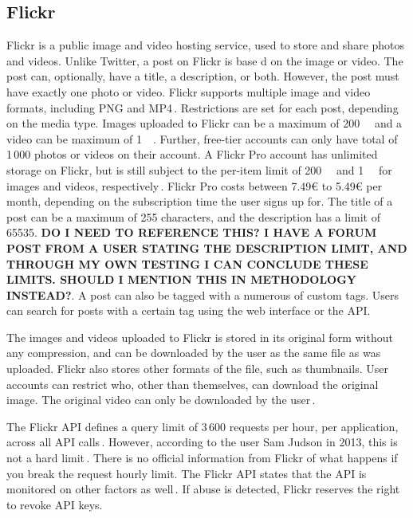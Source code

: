 \subsection{Flickr}
\label{subsec:ows_flickr}
Flickr is a public image and video hosting service, used to store and share photos and videos. Unlike Twitter, a post on Flickr is base d on the image or video. The post can, optionally, have a title, a description, or both. However, the post must have exactly one photo or video. Flickr supports multiple image and video formats, including PNG and MP4\,\cite{FlickrUploadRequirements2022}. Restrictions are set for each post, depending on the media type. Images uploaded to Flickr can be a maximum of \SI{200}{\mega\byte} and a video can be maximum of \SI{1}{\giga\byte}. Further, free-tier accounts can only have total of 1\,000 photos or videos on their account. A Flickr Pro account has unlimited storage on Flickr, but is still subject to the per-item limit of \SI{200}{\mega\byte} and \SI{1}{\giga\byte} for images and videos, respectively\,\cite{flickrUpgradeEverythingYou}. Flickr Pro costs between 7.49€ to 5.49€ per month, depending on the subscription time the user signs up for. The title of a post can be a maximum of 255 characters, and the description has a limit of 65535. \textbf{DO I NEED TO REFERENCE THIS? I HAVE A FORUM POST FROM A USER STATING THE DESCRIPTION LIMIT, AND THROUGH MY OWN TESTING I CAN CONCLUDE THESE LIMITS. SHOULD I MENTION THIS IN METHODOLOGY INSTEAD?}. A post can also be tagged with a numerous of custom tags. Users can search for posts with a certain tag using the web interface or the API.

The images and videos uploaded to Flickr is stored in its original form without any compression, and can be downloaded by the user as the same file as was uploaded\cite{flickrDownloadPermissions}. Flickr also stores other formats of the file, such as thumbnails. User accounts can restrict who, other than themselves, can download the original image. The original video can only be downloaded by the user\,\cite{flickrDownloadPermissions}.

The Flickr API defines a query limit of 3\,600 requests per hour, per application, across all API calls\,\cite{flickrFlickrFlickrDeveloper}. However, according to the user Sam Judson in 2013, this is not a hard limit\,\cite{WhatAreAPI2013}. There is no official information from Flickr of what happens if you break the request hourly limit. The Flickr API states that the API is monitored on other factors as well\,\cite{flickrFlickrFlickrDeveloper}. If abuse is detected, Flickr reserves the right to revoke API keys.
